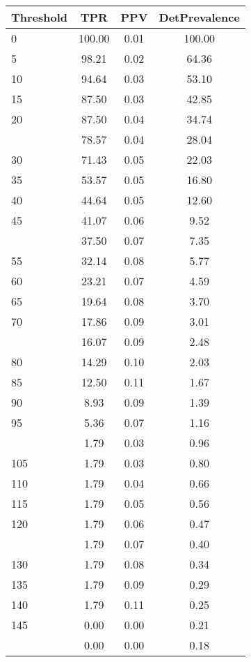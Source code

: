 \begin{table}[ht]
\centering
\begin{tabular}{lccc}
  \toprule
Threshold & TPR & PPV & DetPrevalence \\ 
  \midrule
0 & 100.00 & 0.01 & 100.00 \\ 
  5 & 98.21 & 0.02 & 64.36 \\ 
  10 & 94.64 & 0.03 & 53.10 \\ 
  15 & 87.50 & 0.03 & 42.85 \\ 
  20 & 87.50 & 0.04 & 34.74 \\ 
   \addlinespace
25 & 78.57 & 0.04 & 28.04 \\ 
  30 & 71.43 & 0.05 & 22.03 \\ 
  35 & 53.57 & 0.05 & 16.80 \\ 
  40 & 44.64 & 0.05 & 12.60 \\ 
  45 & 41.07 & 0.06 & 9.52 \\ 
   \addlinespace
50 & 37.50 & 0.07 & 7.35 \\ 
  55 & 32.14 & 0.08 & 5.77 \\ 
  60 & 23.21 & 0.07 & 4.59 \\ 
  65 & 19.64 & 0.08 & 3.70 \\ 
  70 & 17.86 & 0.09 & 3.01 \\ 
   \addlinespace
75 & 16.07 & 0.09 & 2.48 \\ 
  80 & 14.29 & 0.10 & 2.03 \\ 
  85 & 12.50 & 0.11 & 1.67 \\ 
  90 & 8.93 & 0.09 & 1.39 \\ 
  95 & 5.36 & 0.07 & 1.16 \\ 
   \addlinespace
100 & 1.79 & 0.03 & 0.96 \\ 
  105 & 1.79 & 0.03 & 0.80 \\ 
  110 & 1.79 & 0.04 & 0.66 \\ 
  115 & 1.79 & 0.05 & 0.56 \\ 
  120 & 1.79 & 0.06 & 0.47 \\ 
   \addlinespace
125 & 1.79 & 0.07 & 0.40 \\ 
  130 & 1.79 & 0.08 & 0.34 \\ 
  135 & 1.79 & 0.09 & 0.29 \\ 
  140 & 1.79 & 0.11 & 0.25 \\ 
  145 & 0.00 & 0.00 & 0.21 \\ 
   \addlinespace
150 & 0.00 & 0.00 & 0.18 \\ 

\end{tabular}
\end{table}
